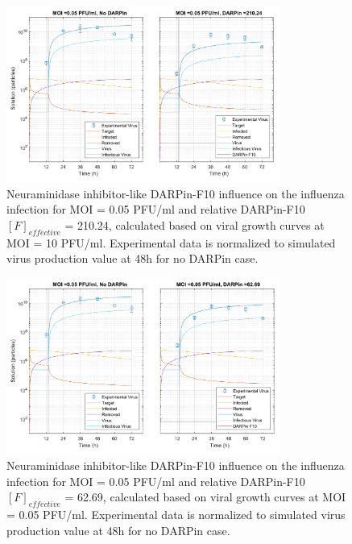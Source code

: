 \begin{figure}
\begin{center}
\includegraphics[width=0.8\textwidth, trim={0cm 0cm 0cm 0cm}, clip]{D_chapters/3_DARPinModels/2_DARPinProduction/comparisonModelTHillIRVViDelayMOI0.072135DARPin210.236AsymmetricDarpinMyosinInhibitor.pdf}
\caption[Neuraminidase inhibitor-like DARPin-F10 for MOI = 0.05 PFU/ml and $F_{effective}$ = 210.24]{Neuraminidase inhibitor-like DARPin-F10 influence on the influenza infection for MOI = 0.05 PFU/ml and relative DARPin-F10 $[F]_{effective}$ = 210.24, calculated based on viral growth curves at MOI = 10 PFU/ml. Experimental data is normalized to simulated virus production value at 48h for no DARPin case.}
\label{figure:neuraminidaseInhibitorLikeF210}
\end{center}
\end{figure}

\begin{figure}
\begin{center}
\includegraphics[width=0.8\textwidth, trim={0cm 0cm 0cm 0cm}, clip]{D_chapters/3_DARPinModels/2_DARPinProduction/comparisonModelTHillIRVViDelayMOI0.072135DARPin62.6898AsymmetricDarpinMyosinInhibitor.pdf}
\caption[Neuraminidase inhibitor-like DARPin-F10 for MOI = 0.05 PFU/ml and $F_{effective}$ = 62.69]{Neuraminidase inhibitor-like DARPin-F10 influence on the influenza infection for MOI = 0.05 PFU/ml and relative DARPin-F10 $[F]_{effective}$ = 62.69, calculated based on viral growth curves at MOI = 0.05 PFU/ml. Experimental data is normalized to simulated virus production value at 48h for no DARPin case.}
\label{figure:neuraminidaseInhibitorLikeF62}
\end{center}
\end{figure}